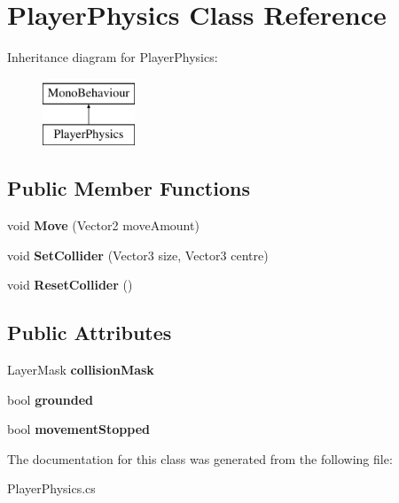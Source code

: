 \hypertarget{classPlayerPhysics}{\section{Player\-Physics Class Reference}
\label{classPlayerPhysics}
}
Inheritance diagram for Player\-Physics\-:\begin{figure}[H]
\begin{center}
\leavevmode
\includegraphics[height=2.000000cm]{classPlayerPhysics}
\end{center}
\end{figure}
\subsection*{Public Member Functions}
\begin{DoxyCompactItemize}
\item 
\hypertarget{classPlayerPhysics_adb50fbe957788574388514fce1dc5d89}{void {\bfseries Move} (Vector2 move\-Amount)}\label{classPlayerPhysics_adb50fbe957788574388514fce1dc5d89}

\item 
\hypertarget{classPlayerPhysics_a097b184f0e6479d3b6d58a4ac03be0a3}{void {\bfseries Set\-Collider} (Vector3 size, Vector3 centre)}\label{classPlayerPhysics_a097b184f0e6479d3b6d58a4ac03be0a3}

\item 
\hypertarget{classPlayerPhysics_a24ed69f034983045687bddc989754878}{void {\bfseries Reset\-Collider} ()}\label{classPlayerPhysics_a24ed69f034983045687bddc989754878}

\end{DoxyCompactItemize}
\subsection*{Public Attributes}
\begin{DoxyCompactItemize}
\item 
\hypertarget{classPlayerPhysics_a46b85788fa905166ae9590cac0666cf5}{Layer\-Mask {\bfseries collision\-Mask}}\label{classPlayerPhysics_a46b85788fa905166ae9590cac0666cf5}

\item 
\hypertarget{classPlayerPhysics_a4bfbf0d7e9812d79434526592790f419}{bool {\bfseries grounded}}\label{classPlayerPhysics_a4bfbf0d7e9812d79434526592790f419}

\item 
\hypertarget{classPlayerPhysics_a790c7afaa2da5eef1fe56524bc671dd4}{bool {\bfseries movement\-Stopped}}\label{classPlayerPhysics_a790c7afaa2da5eef1fe56524bc671dd4}

\end{DoxyCompactItemize}


The documentation for this class was generated from the following file\-:\begin{DoxyCompactItemize}
\item 
Player\-Physics.\-cs\end{DoxyCompactItemize}
